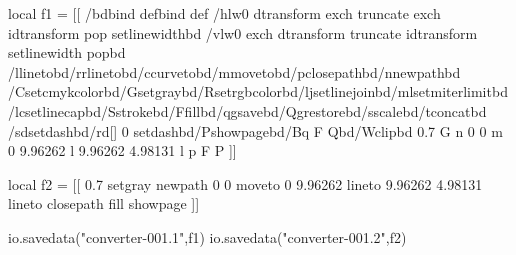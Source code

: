 \startluacode

local f1 = [[
/bd{bind def}bind def
/hlw{0 dtransform exch truncate exch idtransform pop setlinewidth}bd
/vlw{0 exch dtransform truncate idtransform setlinewidth pop}bd
/l{lineto}bd/r{rlineto}bd/c{curveto}bd/m{moveto}bd/p{closepath}bd/n{newpath}bd
/C{setcmykcolor}bd/G{setgray}bd/R{setrgbcolor}bd/lj{setlinejoin}bd/ml{setmiterlimit}bd
/lc{setlinecap}bd/S{stroke}bd/F{fill}bd/q{gsave}bd/Q{grestore}bd/s{scale}bd/t{concat}bd
/sd{setdash}bd/rd{[] 0 setdash}bd/P{showpage}bd/B{q F Q}bd/W{clip}bd
 0.7 G
n 0 0 m
0 9.96262 l
9.96262 4.98131 l
 p F
P
]]

local f2 = [[
 0.7 setgray
newpath 0 0 moveto
0 9.96262 lineto
9.96262 4.98131 lineto
 closepath fill
showpage
]]

io.savedata("converter-001.1",f1)
io.savedata("converter-001.2",f2)

\stopluacode


\startTEXpage
    \externalfigure[converter-001.1][frame=on]
    \externalfigure[converter-001.2][frame=on]
\stopTEXpage
